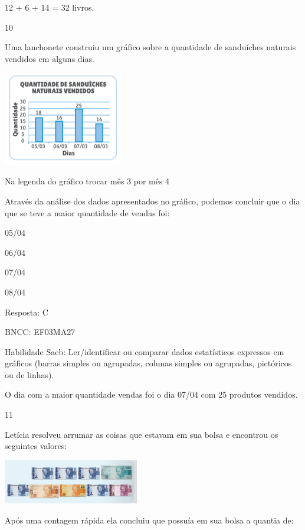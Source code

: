 \begin{escolha}
{\begin{escolha}
{12 + 6 + 14 = 32 livros.

\num{10}

Uma lanchonete construiu um gráfico sobre a quantidade de sanduíches
naturais vendidos em alguns dias.

\includegraphics[width=2.05128in,height=1.61850in]{media/image124.png}

Na legenda do gráfico trocar mês 3 por mês 4

Através da análise dos dados apresentados no gráfico, podemos concluir
que o dia que se teve a maior quantidade de vendas foi:

\begin{escolha}

\item
  05/04
\item
  06/04
\item
  07/04
\item
  08/04
\end{escolha}

Resposta: C

BNCC: EF03MA27

Habilidade Saeb: Ler/identificar ou comparar dados estatísticos
expressos em gráficos (barras simples ou agrupadas, colunas simples ou
agrupadas, pictóricos ou de linhas).

O dia com a maior quantidade vendas foi o dia 07/04 com 25 produtos
vendidos.

\num{11}

Letícia resolveu arrumar as coisas que estavam em sua bolsa e encontrou
os seguintes valores:

\includegraphics[width=2.33354in,height=0.76673in]{media/image125.png}

Após uma contagem rápida ela concluiu que possuía em sua bolsa a quantia
de:

\begin{escolha}


\end{escolha}}
\end{escolha}}
\end{escolha}

